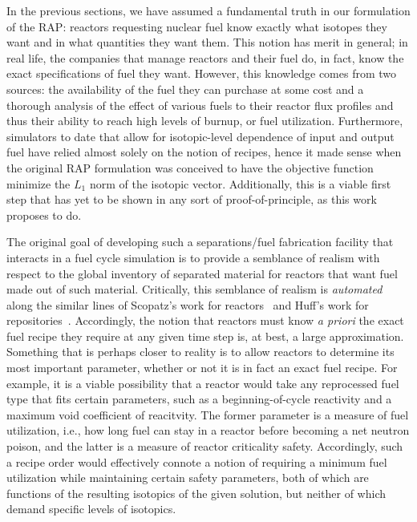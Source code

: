 In the previous sections, we have assumed a fundamental truth in our formulation
of the RAP: reactors requesting nuclear fuel know exactly what isotopes they
want and in what quantities they want them. This notion has merit in general; in
real life, the companies that manage reactors and their fuel do, in fact, know
the exact specifications of fuel they want. However, this knowledge comes from
two sources: the availability of the fuel they can purchase at some cost and a
thorough analysis of the effect of various fuels to their reactor flux profiles
and thus their ability to reach high levels of burnup, or fuel
utilization. Furthermore, simulators to date that allow for isotopic-level
dependence of input and output fuel have relied almost solely on the notion of
recipes, hence it made sense when the original RAP formulation was conceived to
have the objective function minimize the $L_1$ norm of the isotopic
vector. Additionally, this is a viable first step that has yet to be shown in
any sort of proof-of-principle, as this work proposes to do.

The original goal of developing such a separations/fuel fabrication facility
that interacts in a fuel cycle simulation is to provide a semblance of realism
with respect to the global inventory of separated material for reactors that
want fuel made out of such material. Critically, this semblance of realism is
\textit{automated} along the similar lines of Scopatz's work for
reactors~\cite{scopatz_essential_2011} and Huff's work for
repositories~\cite{huff_integrated_2013}. Accordingly, the notion that reactors
must know \textit{a priori} the exact fuel recipe they require at any given time
step is, at best, a large approximation. Something that is perhaps closer to
reality is to allow reactors to determine its most important parameter, whether
or not it is in fact an exact fuel recipe. For example, it is a viable
possibility that a reactor would take any reprocessed fuel type that fits
certain parameters, such as a beginning-of-cycle reactivity and a maximum void
coefficient of reacitvity. The former parameter is a measure of fuel
utilization, i.e., how long fuel can stay in a reactor before becoming a net
neutron poison, and the latter is a measure of reactor criticality
safety. Accordingly, such a recipe order would effectively connote a notion of
requiring a minimum fuel utilization while maintaining certain safety
parameters, both of which are functions of the resulting isotopics of the given
solution, but neither of which demand specific levels of isotopics.

